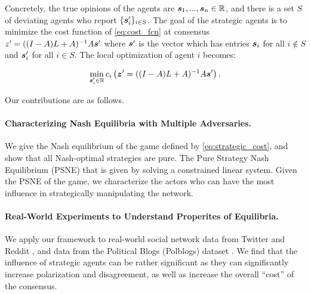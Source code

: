 Concretely, the true opinions of the agents are $\bm{s}_1, ..., \bm{s}_n \in \mathbb{R}$, and there is a set $S$ of deviating agents who report $\{ \bm{s}_i^\prime \}_{i \in S}$. 
The goal of the strategic agents is to minimize the cost function of \cref{eq:cost_fcn} at consensus $z^\prime = ((I - A)L + A)^{-1} A \bm{s}^\prime$ where $\bm{s}^\prime$ 
is the vector which has entries $\bm{s}_i$ for all $i \notin S$ and $\bm{s}_i^\prime$ for all $i \in S$. The local optimization of agent $i$ becomes:

\begin{equation} \label{eq:strategic_cost}
    \min_{\bm{s}_i^\prime \in \mathbb{R}} c_i \left (\bm{z}^\prime = ((I - A)L + A)^{-1} A \bm{s}^\prime \right ).
\end{equation}


\noindent Our {contributions} are as follows. 

\paragraph{Characterizing Nash Equilibria with Multiple Adversaries.} We give the Nash equilibrium of the game defined by \cref{eq:strategic_cost}, and show that all Nash-optimal strategies are pure. The Pure Strategy Nash Equilibrium (PSNE) that is given by solving a constrained linear system. Given the PSNE of the game, we characterize the actors who can have the most influence in strategically manipulating the network. 



\paragraph{Real-World Experiments to Understand Properites of Equilibria.} We apply our framework to real-world social network data from Twitter and Reddit \citep{Chitra2020}, and data from the Political Blogs (Polblogs) dataset \citep{adamic2005political}. We find that the influence of strategic agents can be rather significant as they can significantly increase polarization and disagreement, as well as increase the overall ``cost'' of the consensus. 

